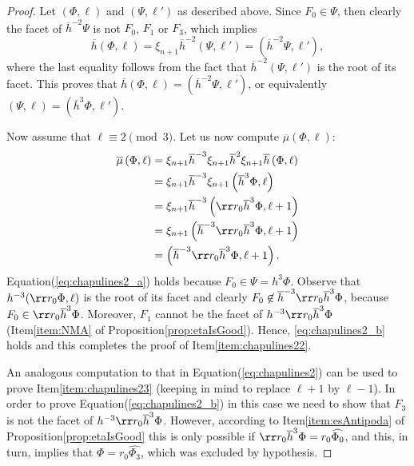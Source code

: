 \documentclass[final]{amsart}
\theoremstyle{plain}
\theoremstyle{definition}
\theoremstyle{remark}
\numberwithin{equation}{section}
\renewcommand{\{}{\lbrace}
\renewcommand{\}}{\rbrace}
\renewcommand{\bar}{\overline}
\renewcommand{\hat}{\widehat}
\newcommand{\kng}{{h}}
\newcommand{\etab}{\bar{\kng}}
\newcommand{\mub}{\bar{\mu}}
\newcommand{\te}{\xi}
\begin{document}
\begin{proof}
 Let $(\Phi,\ell)$ and $(\Psi, \ell')$ as described above.
 Since $F_{0} \in \Psi$, then clearly the facet of $\etab^{-2}\Psi$ is not $F_{0}$, $ F_{1} $ or $F_{3}$, which implies
 \[\etab\left( \Phi,\ell \right) = \te_{n+1} \etab^{-2} (\Psi, \ell') = (\etab^{-2} \Psi, \ell' ),\]
 where the last equality follows from the fact that $\etab^{-2}(\Psi, \ell' )$ is the root of its facet.
 This proves that $\etab (\Phi,\ell) = (\etab^{-2 } \Psi,\ell')$, or equivalently $(\Psi,\ell) = (\etab^{3 } \Phi,\ell')$.

  Now assume that $\ell \equiv 2 \pmod{3}$.
  Let us now compute $\mub\left( \Phi, \ell \right)$:
  \begin{subequations} \label{eq:chapulines2}
    \begin{align}
      \mub\left( \Phi, \ell \right)
      &= \te_{n+1} \etab^{-3} \te_{n+1} \etab^{2} \te_{n+1} \etab \left( \Phi, \ell \right) \nonumber \\
&= \te_{n+1} \etab^{-3} \te_{n+1}   \left(\etab^{3} \Phi, \ell \right) \nonumber \\
      &= \te_{n+1} \etab^{-3}   \left(\rr r_{0} \etab^{3} \Phi, \ell+1 \right) \label{eq:chapulines2_a} \\
      &= \te_{n+1}    \left(\etab^{-3} \rr r_{0} \etab^{3} \Phi, \ell+1 \right) \nonumber \\
&=     \left( \etab^{-3} \rr r_{0} \etab^{3} \Phi, \ell+1 \right) \label{eq:chapulines2_b}.
    \end{align}
  \end{subequations}
  Equation\nobreakspace \textup {(\ref {eq:chapulines2_a})} holds because $F_{0} \in \Psi = \kng^{3}\Phi$.
  Observe that $\kng^{-3}(\rr r_0 \Phi,\ell)$ is the root of its facet and clearly $F_{0} \not\in \etab^{-3}\rr r_0 \etab^{3} \Phi$, because $F_{0} \in \rr r_{0} \etab^{3}\Phi$.
  Moreover, $F_{1}$ cannot be the facet of $\kng^{-3}\rr r_0 \etab^{3} \Phi$ (Item\nobreakspace \ref {item:NMA} of  Proposition\nobreakspace \ref {prop:etaIsGood}).
  Hence, \eqref{eq:chapulines2_b} holds and this completes the proof of Item\nobreakspace \ref {item:chapulines22}.

  An analogous computation to that in Equation\nobreakspace \textup {(\ref {eq:chapulines2})} can be used to prove Item\nobreakspace \ref {item:chapulines23} (keeping in mind to replace $\ell+1$ by $\ell-1$).
   In order to prove Equation\nobreakspace \textup {(\ref {eq:chapulines2_b})} in this case we need to show that $F_3$ is not the facet of $\kng^{-3}\rr r_0 \etab^{3} \Phi$. However, according to Item\nobreakspace \ref {item:esAntipoda} of Proposition\nobreakspace \ref {prop:etaIsGood} this is only possible if $\rr r_0 \etab^{3}\Phi = r_{0}\hat{\Phi_{0}}$, and this, in turn, implies that $\Phi = r_{0}\hat{\Phi_{3}}$, which was excluded by hypothesis.






\end{proof}
\end{document}
